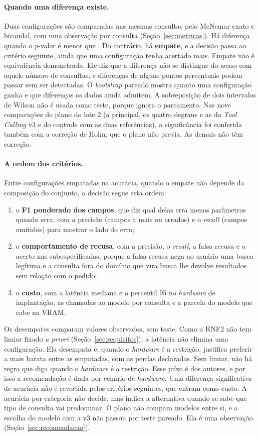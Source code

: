 \paragraph{Quando uma diferença existe.} Duas configurações são comparadas nas mesmas consultas pelo McNemar exato e bicaudal, com uma observação por consulta (Seção~\ref{sec:metricas}). Há diferença quando o \textit{p}-valor é menor que . Do contrário, há \textbf{empate}, e a decisão passa ao critério seguinte, ainda que uma configuração tenha acertado mais. Empate não é equivalência demonstrada. Ele diz que a diferença não se distingue do acaso com aquele número de consultas, e diferenças de alguns pontos percentuais podem passar sem ser detectadas. O \textit{bootstrap} pareado mostra quanto uma configuração ganha e que diferenças os dados ainda admitem. A sobreposição de dois intervalos de Wilson não é usada como teste, porque ignora o pareamento. Nas nove comparações do plano do lote 2 (a principal, os quatro degraus e as do \textit{Tool Calling} v3 e do controle com as duas referências), a significância foi conferida também com a correção de Holm, que o plano não previa. As demais não têm correção.

\paragraph{A ordem dos critérios.} Entre configurações empatadas na acurácia, quando o empate não depende da composição do conjunto, a decisão segue esta ordem:
\begin{enumerate}
  \item o \textbf{F1 ponderado dos campos}, que diz qual delas erra menos parâmetros quando erra, com a precisão (campos a mais ou errados) e o \textit{recall} (campos omitidos) para mostrar o lado do erro;
  \item o \textbf{comportamento de recusa}, com a precisão, o \textit{recall}, a falsa recusa e o acerto nas subespecificadas, porque a falsa recusa nega ao usuário uma busca legítima e a consulta fora do domínio que vira busca lhe devolve resultados sem relação com o pedido;
  \item o \textbf{custo}, com a latência mediana e o percentil 95 no \textit{hardware} de implantação, as chamadas ao modelo por consulta e a parcela do modelo que cabe na VRAM.
\end{enumerate}

Os desempates comparam valores observados, sem teste. Como o RNF2 não tem limiar fixado \textit{a priori} (Seção~\ref{sec:requisitos}), a latência não elimina uma configuração. Ela desempata e, quando o \textit{hardware} é a restrição, justifica preferir a mais barata entre as empatadas, com as perdas declaradas. Sem limiar, não há regra que diga quando o \textit{hardware} é a restrição. Esse juízo é dos autores, e por isso a recomendação é dada por cenário de \textit{hardware}. Uma diferença significativa de acurácia não é revertida pelos critérios seguintes, que entram como custo. A acurácia por categoria não decide, mas indica a alternativa quando se sabe que tipo de consulta vai predominar. O plano não compara modelos entre si, e a escolha do modelo com a v3 não passou por teste pareado. Ela é uma observação (Seção~\ref{sec:recomendacao}).

